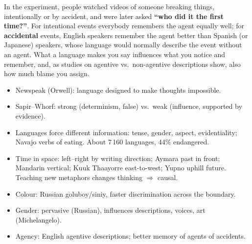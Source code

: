 In the experiment, people watched videos of someone breaking things, intentionally or
by accident, and were later asked \textbf{``who did it the first time?''}. For
intentional events everybody remembers the agent equally well; for \textbf{accidental}
events, English speakers remember the agent better than Spanish (or Japanese) speakers,
whose language would normally describe the event without an agent. What a language makes
you say influences what you notice and remember, and, as studies on agentive vs.\
non-agentive descriptions show, also how much blame you assign.

\begin{nbsummary}
\begin{itemize}[nosep]
  \item Newspeak (Orwell): language designed to make thoughts impossible.
  \item Sapir--Whorf: strong (determinism, false) vs.\ weak (influence, supported by
        evidence).
  \item Languages force different information: tense, gender, aspect, evidentiality;
        Navajo verbs of eating. About 7\,160 languages, 44\% endangered.
  \item Time in space: left--right by writing direction; Aymara past in front; Mandarin
        vertical; Kuuk Thaayorre east-to-west; Yupno uphill future. Teaching new
        metaphors changes thinking $\Rightarrow$ causal.
  \item Colour: Russian goluboy/siniy, faster discrimination across the boundary.
  \item Gender: pervasive (Russian), influences descriptions, voices, art (Michelangelo).
  \item Agency: English agentive descriptions; better memory of agents of accidents.
\end{itemize}
\end{nbsummary}
